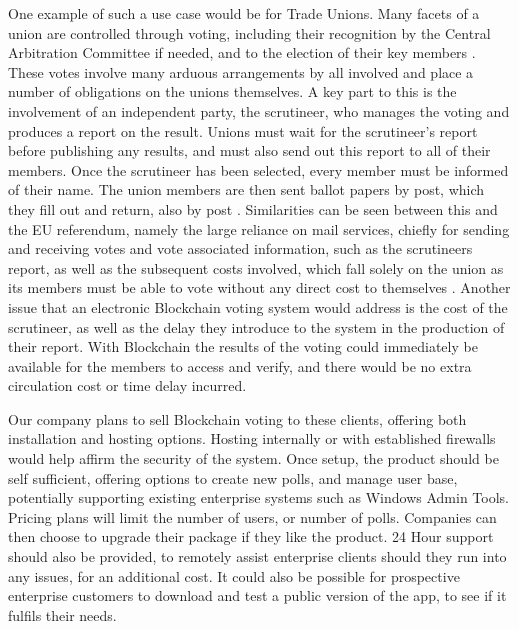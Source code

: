 \documentclass{article}
\begin{document}
\par

One example of such a use case would be for Trade Unions. Many facets of a union are controlled through voting, including their recognition by the Central Arbitration Committee if needed, \parencite{Employer56:online} and to the election of their key members \parencite{uktradeuni:online, Tradeuni41:online}. These votes involve many arduous arrangements by all involved and place a number of obligations on the unions themselves. A key part to this is the involvement of an independent party, the scrutineer, who manages the voting and produces a report on the result. Unions must wait for the scrutineer's report before publishing any results, and must also send out this report to all of their members. Once the scrutineer has been selected, every member must be informed of their name. The union members are then sent ballot papers by post, which they fill out and return, also by post \parencite{uktradeuni:online}. Similarities can be seen between this and the EU referendum, namely the large reliance on mail services, chiefly for sending and receiving votes and vote associated information, such as the scrutineers report, as well as the subsequent costs involved, which fall solely on the union as its members must be able to vote without any direct cost to themselves \parencite{uktradeuni:online}. Another issue that an electronic Blockchain voting system would address is the cost of the scrutineer, as well as the delay they introduce to the system in the production of their report. With Blockchain the results of the voting could immediately be available for the members to access and verify, and there would be no extra circulation cost or time delay incurred.

\par

Our company plans to sell Blockchain voting to these clients, offering both installation and hosting options. Hosting internally or with established firewalls would help affirm the security of the system. Once setup, the product should be self sufficient, offering options to create new polls, and manage user base, potentially supporting existing enterprise systems such as Windows Admin Tools. Pricing plans will limit the number of users, or number of polls. Companies can then choose to upgrade their package if they like the product. 24 Hour support should also be provided, to remotely assist enterprise clients should they run into any issues, for an additional cost. It could also be possible for prospective enterprise customers to download and test a public version of the app, to see if it fulfils their needs.
\end{document}
